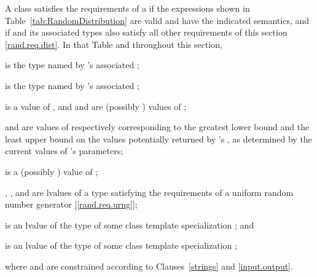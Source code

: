 \pnum
A class 
satisfies the requirements
of a 
if the expressions shown
in Table~\ref{tab:RandomDistribution}
are valid and have the indicated semantics,
and if  and its associated types
also satisfy all other requirements
of this section \ref{rand.req.dist}.
In that Table and throughout this section,
\begin{enumeratea}
  \item
     is the type named by
    's associated ;
  \item
     is the type named by
    's associated ;
  \item
     is a
    value of ,
    and
     and  are (possibly ) values of ;
  \item
     and 
    are values of 
    respectively corresponding to
    the greatest lower bound and the least upper bound
    on the values potentially returned by 's ,
    as determined by the current values of 's parameters;
  \item
     is a (possibly ) value of ;
  \item
    , , and  are lvalues of a type
    satisfying the requirements
    of a uniform random number generator [\ref{rand.req.urng}];
  \item
     is an lvalue of the type of some class template specialization
     ;
  and
  \item
     is an lvalue of the type of some class template specialization
     ;
\end{enumeratea}
where  and  are constrained
according to Clauses~\ref{strings} and \ref{input.output}.

